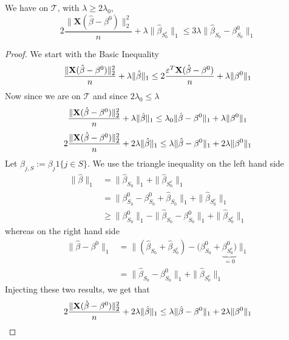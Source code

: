 \begin{lemma}[Lemma 6.3.]
    \label{lemma 6.3.}
    We have on $\mathscr{T}$, with $\lambda \geq 2 \lambda_{0}$,
    $$
        2\frac{ \|\mathbf{X} (\hat{\beta}-\beta^{0} ) \|_{2}^{2}}{n} + \lambda \|\hat{\beta}_{S_{0}^{c}} \|_{1} \leq 3 \lambda \|\hat{\beta}_{S_{0}}-\beta_{S_{0}}^{0} \|_{1}
    $$
\end{lemma}
\begin{proof}
    We start with the Basic Inequality
    $$
        \frac{\| \mathbf{X} (\hat{\beta}-\beta^{0})\|_{2}^{2}}{n} + \lambda\|\hat{\beta}\|_{1} \leq 2 \frac{\varepsilon^{T} \mathbf{X} (\hat{\beta}-\beta^{0})}{n}+\lambda\|\beta^{0}\|_{1}
    $$
    Now since we are on $\mathscr{T}$ and since $2 \lambda_0 \leq \lambda$
    $$
        \frac{\| \mathbf{X} (\hat{\beta}-\beta^{0})\|_{2}^{2}}{n} + \lambda\|\hat{\beta}\|_{1} \leq \lambda_0 \|\hat{\beta}-\beta^{0}\|_1 + \lambda\|\beta^{0}\|_{1}
    $$
    $$
        2 \frac{\| \mathbf{X} (\hat{\beta}-\beta^{0})\|_{2}^{2}}{n}+2 \lambda\|\hat{\beta}\|_{1} \leq \lambda \|\hat{\beta}-\beta^{0} \|_{1}+2 \lambda \|\beta^{0} \|_{1}
    $$
    Let $\beta_{j, S}:=\beta_{j} 1\{j \in S\}$. We use the triangle inequality on the left hand side
    \begin{align*}
        \|\hat{\beta}\|_{1}
         & = \|\hat{\beta}_{S_{0}} \|_{1} + \|\hat{\beta}_{S_{0}^{c}} \|_{1}                                                  \\
         & = \|\beta_{S_{0}}^{0} - \beta_{S_{0}}^{0} + \hat{\beta}_{S_{0}} \|_{1} + \|\hat{\beta}_{S_{0}^{c}} \|_{1}          \\
         & \geq \|\beta_{S_{0}}^{0} \|_{1} - \|\hat{\beta}_{S_{0}}-\beta_{S_{0}}^{0} \|_{1}+ \|\hat{\beta}_{S_{0}^{c}} \|_{1}
    \end{align*}
    whereas on the right hand side
    \begin{align*}
        \|\hat{\beta}-\beta^{0} \|_{1}
         & =  \| (\hat{\beta}_{S_{0}} + \hat{\beta}_{S_{0}^{c}}) - (\beta_{S_{0}}^{0} + \underbrace{\beta_{S_{0}^{c}}^0)}_{=0} \|_{1} \\
         & =  \| \hat{\beta}_{S_{0}}-\beta_{S_{0}}^{0} \|_{1} + \|\hat{\beta}_{S_{0}^{c}} \|_{1}
    \end{align*}
    Injecting these two results, we get that
    \begin{align*}
                 & 2 \frac{\| \X (\hat{\beta}-\beta^{0})\|_{2}^{2}}{n} + 2 \lambda\|\hat{\beta}\|_{1} \leq \lambda \|\hat{\beta}-\beta^{0} \|_{1}+2 \lambda \|\beta^{0} \|_{1}                                                                                                  \\

\end{align*}
\end{proof}
